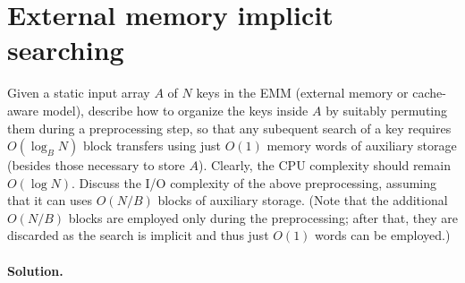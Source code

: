 \section{External memory implicit searching}
Given a static input array $A$ of $N$ keys in the EMM (external memory or cache-aware model), describe how to organize the keys inside $A$ by suitably permuting them during a preprocessing step, so that any subequent search of a key requires $O(\log_B N)$ block transfers using just $O(1)$ memory words of auxiliary storage (besides those necessary to store $A$). Clearly, the CPU complexity should remain $O(\log N)$. Discuss the I/O complexity of the above preprocessing, assuming that it can uses $O(N/B)$ blocks of auxiliary storage. (Note that the additional $O(N/B)$ blocks are employed only during the preprocessing; after that, they are discarded as the search is implicit and thus just $O(1)$ words can be employed.)

\vspace{0.5cm}
\paragraph{Solution.}